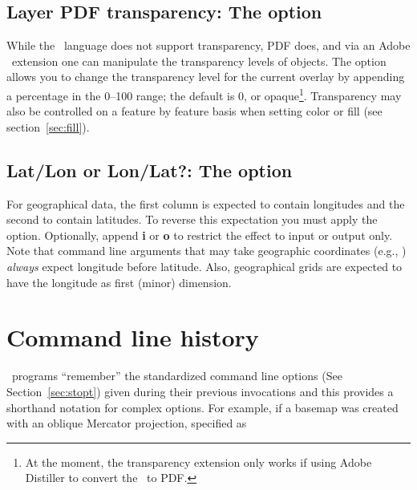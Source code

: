 \subsection{Layer PDF transparency: The  option}
\label{sec:ltransp}

While the \PS\ language does not support transparency, PDF does, and via an Adobe \PS\ extension
one can manipulate the transparency levels of objects.  The  option allows you to change
the transparency level for the current overlay by appending a percentage in the 0--100 range; the
default is 0, or opaque\footnote{At the moment, the transparency extension only works if
using Adobe Distiller to convert the \PS\ to PDF.}.  Transparency may also be controlled
on a feature by feature basis when setting color or fill (see section~\ref{sec:fill}).

\subsection{Lat/Lon or Lon/Lat?: The \Opt{:} option}

For geographical data, the first column is expected to contain longitudes
and the second to contain latitudes.  To reverse this expectation you must
apply the \Opt{:} option.  Optionally, append \textbf{i} or \textbf{o} to restrict
the effect to input or output only.  Note that command line arguments that may take
geographic coordinates (e.g., ) \emph{always} expect longitude before
latitude. Also, geographical grids are expected to have the longitude as
first (minor) dimension.

%

\section{Command line history}
\label{sec:gmtcommands}

\GMT\ programs ``remember'' the standardized command line options
(See Section~\ref{sec:stopt}) given during their previous invocations
and this provides a shorthand notation for complex options.
For example, if a basemap was created with an oblique Mercator
projection, specified as

\vspace{\baselineskip} 

